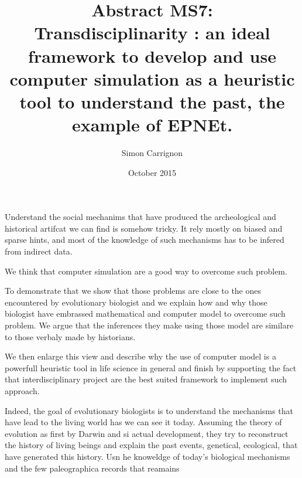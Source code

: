 \documentclass[a4paper]{article}
\title{Abstract MS7:\\ Transdisciplinarity : an ideal framework to develop and use computer simulation as a heuristic tool to understand the past, the example of EPNEt.}
\author{Simon Carrignon}
\date{October 2015}
\begin{document}
\maketitle 


Understand the social mechanims that have produced the archeological and historical artifcat we can find is somehow tricky. It rely mostly on biased and sparse hints, and most of the knowledge of such mechanisms has to be infered from indirect data.

We think that computer simulation are a good way to overcome such problem.

To demonstrate that we show that those problems are close to the ones encountered by evolutionary biologist and we explain how and why those biologist have embrassed mathematical and computer model to overcome such problem. We argue that the inferences they make using those model are similare to those verbaly made by historians.

We then enlarge this view and describe why the use of computer model is a powerfull heuristic tool in life science in general and finish by supporting the fact that interdisciplinary project are the best suited framework to implement such approach.

Indeed, the goal of evolutionary biologists is to understand the mechanisms that have lead to the living world has we can see it today. Assuming the theory of evolution as first by Darwin and si actual development, they try to reconstruct the history of living beings and explain the past events, genetical, ecological, that have generated this history. Usn he knoweldge of today's biological mechanisms and the few paleographica records that reamains 
\end{document}
